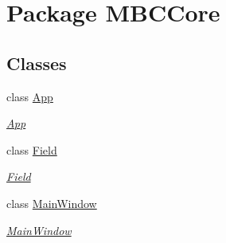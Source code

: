 \hypertarget{namespace_m_b_c_core}{\section{Package M\-B\-C\-Core}
\label{namespace_m_b_c_core}
}
\subsection*{Classes}
\begin{DoxyCompactItemize}
\item 
class \hyperlink{class_m_b_c_core_1_1_app}{App}
\begin{DoxyCompactList}\small\item\em \hyperlink{class_m_b_c_core_1_1_app}{App} \end{DoxyCompactList}\item 
class \hyperlink{class_m_b_c_core_1_1_field}{Field}
\begin{DoxyCompactList}\small\item\em \hyperlink{class_m_b_c_core_1_1_field}{Field} \end{DoxyCompactList}\item 
class \hyperlink{class_m_b_c_core_1_1_main_window}{Main\-Window}
\begin{DoxyCompactList}\small\item\em \hyperlink{class_m_b_c_core_1_1_main_window}{Main\-Window} \end{DoxyCompactList}\end{DoxyCompactItemize}
